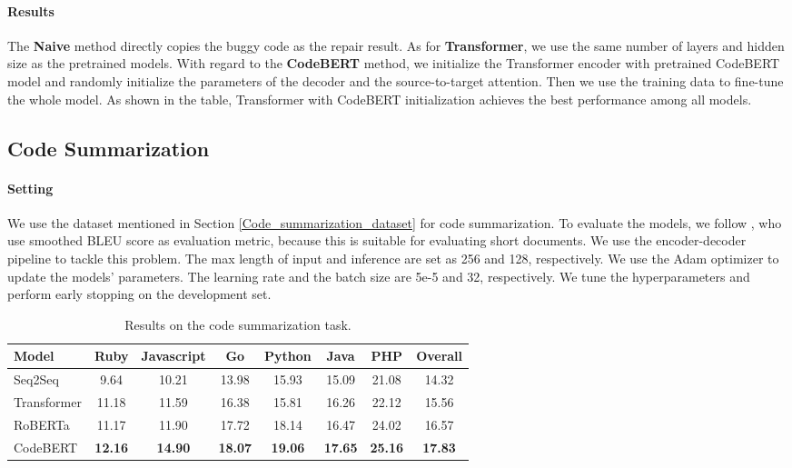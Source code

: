 \documentclass[sigconf,nonacm,screen]{acmart}
\begin{document}
\paragraph{Results}
The \textbf{Naive} method  directly copies the buggy code as the repair result. As for \textbf{Transformer}, we use the same number of layers and hidden size as the pretrained models. 
With regard to the \textbf{CodeBERT} method, 
we initialize the Transformer encoder with pretrained CodeBERT model and randomly initialize the parameters of the decoder and the source-to-target attention. Then we use the training data to fine-tune the whole model. As shown in the table, Transformer with CodeBERT initialization achieves the best performance among all models.



\subsection{Code Summarization}
\paragraph{Setting}
We use the dataset mentioned in Section \ref{Code_summarization_dataset} for code summarization. To evaluate the models, we follow \citet{feng2020codebert}, who use smoothed BLEU score \cite{lin2004orange} as evaluation metric, because this is suitable for evaluating short documents. 
We use the encoder-decoder pipeline to tackle this problem.
The max length of input and inference are set as 256 and 128, respectively. We use
the Adam optimizer to update the models' parameters. The learning rate and the batch size are 5e-5 and 32, respectively. We tune the hyperparameters and perform early stopping on the development set. 
\begin{table*}
\begin{center}
\caption{Results on the code summarization task.}
\label{table-code2nl-reults-codesearchnet}
\begin{tabular}{lccccccc}
\toprule
Model & Ruby & Javascript & Go & Python & Java & PHP & Overall\\
\midrule
Seq2Seq & 9.64 & 10.21 & 13.98 & 15.93 & 15.09 & 21.08 & 14.32\\
Transformer & 11.18 & 11.59 & 16.38 & 15.81 & 16.26 & 22.12 & 15.56\\
RoBERTa & 11.17 & 11.90 & 17.72 & 18.14 & 16.47 & 24.02 & 16.57\\
CodeBERT  & {\bf 12.16} & {\bf 14.90} & \bf{18.07} & {\bf 19.06} & {\bf 17.65} & {\bf 25.16} & {\bf 17.83}\\
\bottomrule
\end{tabular}

\end{center}
\end{table*}
\end{document}
